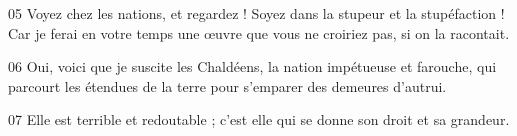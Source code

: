 
05 Voyez chez les nations, et regardez ! Soyez dans la stupeur et la stupéfaction ! Car je ferai en votre temps une œuvre que vous ne croiriez pas, si on la racontait.

06 Oui, voici que je suscite les Chaldéens, la nation impétueuse et farouche, qui parcourt les étendues de la terre pour s’emparer des demeures d’autrui.

07 Elle est terrible et redoutable ; c’est elle qui se donne son droit et sa grandeur.
